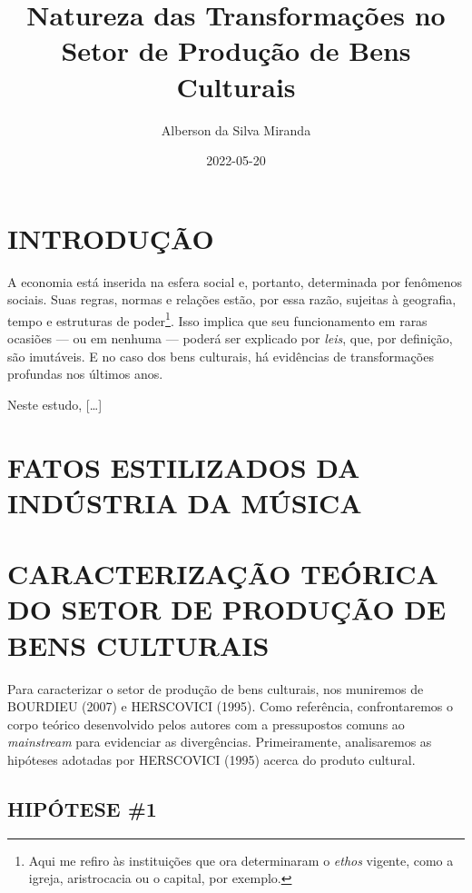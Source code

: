 \documentclass[
]{article}
\title{Natureza das Transformações no Setor de Produção de Bens
Culturais}
\author{Alberson da Silva Miranda}
\date{2022-05-20}
\begin{document}
\maketitle

\hypertarget{introduuxe7uxe3o}{%
\section*{INTRODUÇÃO}\label{introduuxe7uxe3o}}

A economia está inserida na esfera social e, portanto, determinada por
fenômenos sociais. Suas regras, normas e relações estão, por essa razão,
sujeitas à geografia, tempo e estruturas de
poder\footnote{Aqui me refiro às instituições que ora determinaram o \textit{ethos} vigente, como a igreja, aristrocacia ou o capital, por exemplo.}.
Isso implica que seu funcionamento em raras ocasiões --- ou em nenhuma
--- poderá ser explicado por \emph{leis}, que, por definição, são
imutáveis. E no caso dos bens culturais, há evidências de transformações
profundas nos últimos anos.

Neste estudo, {[}\ldots{]}

\hypertarget{fatos-estilizados-da-induxfastria-da-muxfasica}{%
\section{FATOS ESTILIZADOS DA INDÚSTRIA DA
MÚSICA}\label{fatos-estilizados-da-induxfastria-da-muxfasica}}

\hypertarget{caracterizauxe7uxe3o-teuxf3rica-do-setor-de-produuxe7uxe3o-de-bens-culturais}{%
\section{CARACTERIZAÇÃO TEÓRICA DO SETOR DE PRODUÇÃO DE BENS
CULTURAIS}\label{caracterizauxe7uxe3o-teuxf3rica-do-setor-de-produuxe7uxe3o-de-bens-culturais}}

Para caracterizar o setor de produção de bens culturais, nos muniremos
de BOURDIEU (2007) e HERSCOVICI (1995). Como referência, confrontaremos
o corpo teórico desenvolvido pelos autores com a pressupostos comuns ao
\emph{mainstream} para evidenciar as divergências. Primeiramente,
analisaremos as hipóteses adotadas por HERSCOVICI (1995) acerca do
produto cultural.

\hypertarget{hipuxf3tese-1}{%
\subsection{HIPÓTESE \#1}\label{hipuxf3tese-1}}
\end{document}
